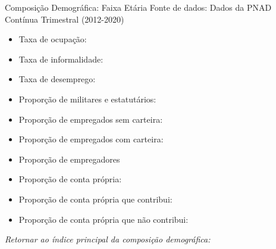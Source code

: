 \begin{frame}[label=_composicao_demografica_faixa_etaria]{Composição Demográfica: Faixa Etária}
{\footnotesize Fonte de dados: Dados da PNAD Contínua Trimestral (2012-2020)}
\begin{itemize}
\item{Taxa de ocupação: \hyperlink{_composicao_demografica_faixa_etaria_taxa_de_ocupacao}{}}
\item{Taxa de informalidade: \hyperlink{_composicao_demografica_faixa_etaria_taxa_de_informalidade}{}}
\item{Taxa de desemprego: \hyperlink{_composicao_demografica_faixa_etaria_taxa_de_desemprego}{}}
\item{Proporção de militares e estatutários: \hyperlink{_composicao_demografica_faixa_etaria_prop_militar}{}}
\item{Proporção de empregados sem carteira: \hyperlink{_composicao_demografica_faixa_etaria_prop_empregadoSC}{}}
\item{Proporção de empregados com carteira: \hyperlink{_composicao_demografica_faixa_etaria_prop_empregadoCC}{}}
\item{Proporção de empregadores \hyperlink{_composicao_demografica_faixa_etaria_prop_empregador}{}}
\item{Proporção de conta própria: \hyperlink{_composicao_demografica_faixa_etaria_prop_cpropria}{}}
\item{Proporção de conta própria que contribui: \hyperlink{_composicao_demografica_faixa_etaria_prop_cpropriaC}{}}
\item{Proporção de conta própria que não contribui: \hyperlink{_composicao_demografica_faixa_etaria_prop_cpropriaNc}{}}
\end{itemize}

\begin{small}
\textit{Retornar ao índice principal da composição demográfica: \hyperlink{_composicao_demografica}{} }
\end{small}

\end{frame}

